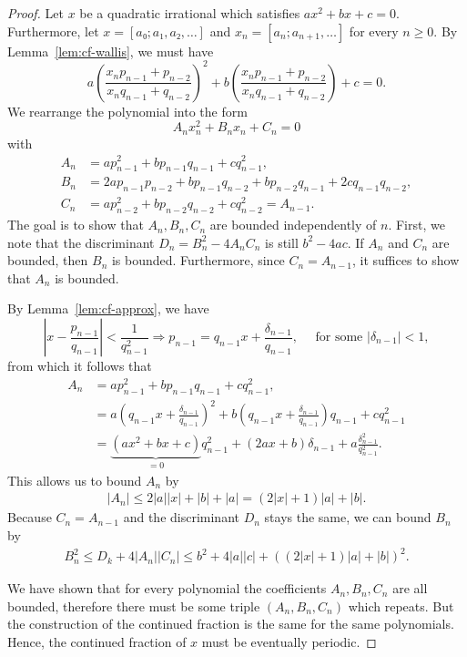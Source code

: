 \begin{proof}
  Let $x$ be a quadratic irrational which satisfies $ax^2 + bx + c = 0$.
  Furthermore, let $x = [a₀; a₁, a₂, …]$ and $x_n = [a_n; a_{n+1}, …]$ for every $n ≥ 0$.
  By Lemma~\ref{lem:cf-wallis}, we must have
  \[
    a \left(\frac{x_n p_{n-1} + p_{n-2}}{x_n q_{n-1} + q_{n-2}}\right)^2
    + b \left(\frac{x_n p_{n-1} + p_{n-2}}{x_n q_{n-1} + q_{n-2}}\right)
    + c = 0.
  \]
  We rearrange the polynomial into the form
  \[
    A_n x_n^2 + B_n x_n + C_n = 0
  \]
  with
  \begin{align*}
    A_n & = a p_{n-1}^2 + b p_{n-1} q_{n-1} + c q_{n-1}^2, \\
    B_n & = 2a p_{n-1} p_{n-2} + b p_{n-1} q_{n-2} + b p_{n-2} q_{n-1} + 2c q_{n-1} q_{n-2}, \\
    C_n & = a p_{n-2}^2 + b p_{n-2} q_{n-2} + c q_{n-2}^2 = A_{n-1}.
  \end{align*}
  The goal is to show that $A_n, B_n, C_n$ are bounded independently of $n$.
  First, we note that the discriminant $D_n = B_n^2 - 4 A_n C_n$ is still $b^2 - 4ac$.
  If $A_n$ and $C_n$ are bounded, then $B_n$ is bounded.
  Furthermore, since $C_n = A_{n-1}$, it suffices to show that $A_n$ is bounded.

  By Lemma~\ref{lem:cf-approx}, we have
  \[
    \left| x - \frac{p_{n-1}}{q_{n-1}} \right| < \frac{1}{q_{n-1}^2}
    \Rightarrow
    p_{n-1} = q_{n-1} x + \frac{δ_{n-1}}{q_{n-1}}, \quad \text{ for some } |δ_{n-1}| < 1,
  \]
  from which it follows that
  \begin{align*}
    A_n & = a p_{n-1}^2 + b p_{n-1} q_{n-1} + c q_{n-1}^2, \\
    & = a \left( q_{n-1} x + \frac{δ_{n-1}}{q_{n-1}} \right)^2 + b \left( q_{n-1} x + \frac{δ_{n-1}}{q_{n-1}} \right) q_{n-1} + c q_{n-1}^2 \\
    & = \underbrace{(ax^2 + bx + c)}_{ = 0} q_{n-1}^2 + (2ax + b) δ_{n-1} + a \frac{δ_{n-1}^2}{q_{n-1}^2}.
  \end{align*}
  This allows us to bound $A_n$ by
  \begin{align*}
    |A_n| ≤ 2|a||x| + |b| + |a| = (2 |x| + 1) |a| + |b|.
  \end{align*}
  Because $C_n = A_{n-1}$ and the discriminant $D_n$ stays the same, we can
  bound $B_n$ by
  \begin{align*}
    B_n^2 ≤ D_k + 4 |A_n| |C_n| ≤ b^2 + 4 |a| |c| + ((2 |x| + 1)|a| + |b|)^2.
  \end{align*}

  We have shown that for every polynomial the coefficients $A_n, B_n, C_n$ are all bounded,
  therefore there must be some triple $(A_n, B_n, C_n)$ which repeats.
  But the construction of the continued fraction is the same for the same polynomials.
  Hence, the continued fraction of $x$ must be eventually periodic.
\end{proof}
